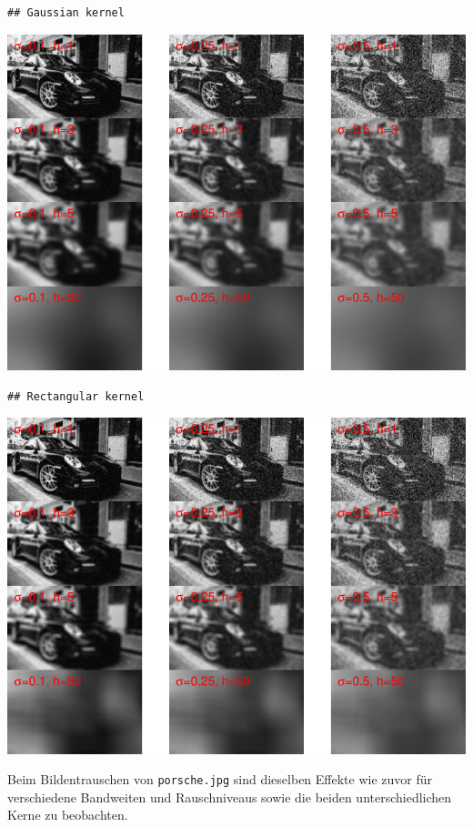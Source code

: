 \documentclass[10pt,]{article}
\begin{document}
\begin{verbatim}
## Gaussian kernel
\end{verbatim}

\includegraphics{project2_files/figure-latex/Nadaraya-Watson-estimator Porsche-2.pdf}

\begin{verbatim}
## Rectangular kernel
\end{verbatim}

\includegraphics{project2_files/figure-latex/Nadaraya-Watson-estimator Porsche-3.pdf}

Beim Bildentrauschen von \texttt{porsche.jpg} sind dieselben Effekte wie
zuvor für verschiedene Bandweiten und Rauschniveaus sowie die beiden
unterschiedlichen Kerne zu beobachten.
\end{document}
